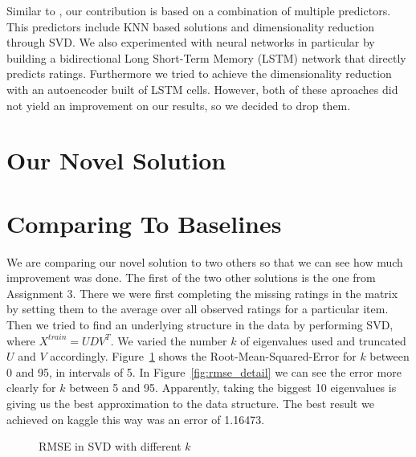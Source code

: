 \documentclass[10pt,conference,compsocconf]{IEEEtran}
\newcommand{\rfig}[1]{Figure~\ref{fig:#1}}
\begin{document}
Similar to \cite{paterek}, our contribution is based on a combination of multiple predictors. This predictors include KNN based solutions and dimensionality reduction through SVD. We also experimented with neural networks in particular by building a bidirectional Long Short-Term Memory (LSTM) network that directly predicts ratings. Furthermore we tried to achieve the dimensionality reduction with an autoencoder built of LSTM cells. However, both of these aproaches did not yield an improvement on our results, so we decided to drop them.\section{Our Novel Solution}

\section{Comparing To Baselines}
We are comparing our novel solution to two others so that we can see how much improvement was done. The first of the two other solutions is the one from Assignment 3. There we were first completing the missing ratings in the matrix by setting them to the average over all observed ratings for a particular item. Then we tried to find an underlying structure in the data by performing SVD, where $X^{train} = UDV^T$. We varied the number $k$ of eigenvalues used and truncated $U$ and $V$ accordingly. \rfig{rmse} shows the Root-Mean-Squared-Error for $k$ between 0 and 95, in intervals of 5. In \rfig{rmse_detail} we can see the error more clearly for $k$ between 5 and 95. Apparently, taking the biggest 10 eigenvalues is giving us the best approximation to the data structure. The best result we achieved on kaggle this way was an error of 1.16473.

\begin{figure}[bp]
\centering
{}
\caption{RMSE in SVD with different $k$}
\label{fig:rmse}
\end{figure}
\end{document}
